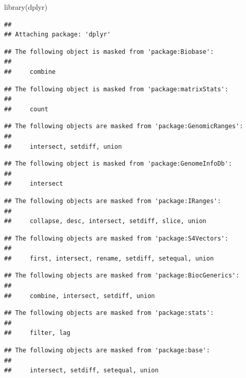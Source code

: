 \documentclass[
]{article}
\newenvironment{Shaded}{\begin{snugshade}}{\end{snugshade}}
\newcommand{\FunctionTok}[1]{\textcolor[rgb]{0.00,0.00,0.00}{#1}}
\newcommand{\NormalTok}[1]{#1}
\begin{document}
\begin{Shaded}
\begin{Highlighting}[]
\FunctionTok{library}\NormalTok{(dplyr)}
\end{Highlighting}
\end{Shaded}

\begin{verbatim}
## 
## Attaching package: 'dplyr'
\end{verbatim}

\begin{verbatim}
## The following object is masked from 'package:Biobase':
## 
##     combine
\end{verbatim}

\begin{verbatim}
## The following object is masked from 'package:matrixStats':
## 
##     count
\end{verbatim}

\begin{verbatim}
## The following objects are masked from 'package:GenomicRanges':
## 
##     intersect, setdiff, union
\end{verbatim}

\begin{verbatim}
## The following object is masked from 'package:GenomeInfoDb':
## 
##     intersect
\end{verbatim}

\begin{verbatim}
## The following objects are masked from 'package:IRanges':
## 
##     collapse, desc, intersect, setdiff, slice, union
\end{verbatim}

\begin{verbatim}
## The following objects are masked from 'package:S4Vectors':
## 
##     first, intersect, rename, setdiff, setequal, union
\end{verbatim}

\begin{verbatim}
## The following objects are masked from 'package:BiocGenerics':
## 
##     combine, intersect, setdiff, union
\end{verbatim}

\begin{verbatim}
## The following objects are masked from 'package:stats':
## 
##     filter, lag
\end{verbatim}

\begin{verbatim}
## The following objects are masked from 'package:base':
## 
##     intersect, setdiff, setequal, union
\end{verbatim}
\end{document}
